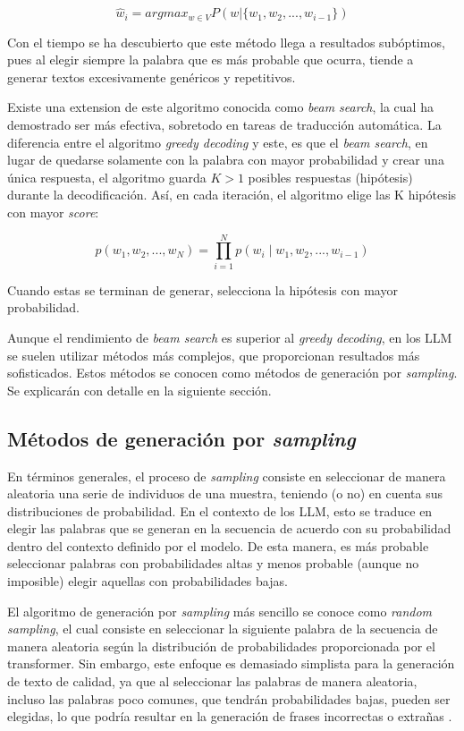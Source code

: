 \documentclass[11pt,spanish,listoffigures,listoftables]{tfgetsinf}
\begin{document}
\begin{equation}
\hat{w}_i = argmax_{w \in V} P(w | \{w_1, w_2, ..., w_{i-1}\})
\end{equation}

Con el tiempo se ha descubierto que este método llega a resultados subóptimos, pues al elegir siempre la palabra que es más probable que ocurra, tiende a generar textos excesivamente genéricos y repetitivos.

Existe una extension de este algoritmo conocida como \textit{beam search}, la cual ha demostrado ser más efectiva, sobretodo en tareas de traducción automática. La diferencia entre el algoritmo \textit{greedy decoding} y este, es que el \textit{beam search}, en lugar de quedarse solamente con la palabra con mayor probabilidad y crear una única respuesta, el algoritmo guarda $K > 1$ posibles respuestas (hipótesis) durante la decodificación. Así, en cada iteración, el algoritmo elige las K hipótesis con mayor \textit{score}:

\begin{equation}
p(w_1, w_2, ..., w_N) = \prod_{i = 1}^{N} p(w_i \mid w_1, w_2, ..., w_{i-1})
\end{equation}

Cuando estas se terminan de generar, selecciona la hipótesis con mayor probabilidad.

Aunque el rendimiento de \textit{beam search} es superior al \textit{greedy decoding}, en los LLM se suelen utilizar métodos más complejos, que proporcionan resultados más sofisticados. Estos métodos se conocen como métodos de generación por \textit{sampling}. Se explicarán con detalle en la siguiente sección.

\subsection{Métodos de generación por \textit{sampling}}

En términos generales, el proceso de \textit{sampling} consiste en seleccionar de manera aleatoria una serie de individuos de una muestra, teniendo (o no) en cuenta sus distribuciones de probabilidad. En el contexto de los LLM, esto se traduce en elegir las palabras que se generan en la secuencia de acuerdo con su probabilidad dentro del contexto definido por el modelo. De esta manera, es más probable seleccionar palabras con probabilidades altas y menos probable (aunque no imposible) elegir aquellas con probabilidades bajas.

 El algoritmo de generación por \textit{sampling} más sencillo se conoce como \textit{random sampling}, el cual consiste en seleccionar la siguiente palabra de la secuencia de manera aleatoria según la distribución de probabilidades proporcionada por el transformer. Sin embargo, este enfoque es demasiado simplista para la generación de texto de calidad, ya que al seleccionar las palabras de manera aleatoria, incluso las palabras poco comunes, que tendrán probabilidades bajas, pueden ser elegidas, lo que podría resultar en la generación de frases incorrectas o extrañas \cite{jurafsky2023speech}.
\end{document}

